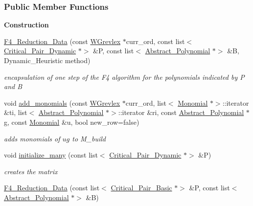 \subsubsection*{Public Member Functions}
\begin{Indent}\textbf{ Construction}\par
\begin{DoxyCompactItemize}
\item 
\hyperlink{group___g_b_computation_a41791d20f96fc7310a40a8e4c63aa4ef}{F4\+\_\+\+Reduction\+\_\+\+Data} (const \hyperlink{group__orderinggroup_class_w_grevlex}{W\+Grevlex} $\ast$curr\+\_\+ord, const list$<$ \hyperlink{group___g_b_computation_class_critical___pair___dynamic}{Critical\+\_\+\+Pair\+\_\+\+Dynamic} $\ast$$>$ \&P, const list$<$ \hyperlink{group__polygroup_class_abstract___polynomial}{Abstract\+\_\+\+Polynomial} $\ast$$>$ \&B, Dynamic\+\_\+\+Heuristic method)
\begin{DoxyCompactList}\small\item\em encapsulation of one step of the F4 algorithm for the polynomials indicated by {\ttfamily P} and {\ttfamily B} \end{DoxyCompactList}\item 
void \hyperlink{group___g_b_computation_a2096fe45e5eecc1c855acb82787f2719}{add\+\_\+monomials} (const \hyperlink{group__orderinggroup_class_w_grevlex}{W\+Grevlex} $\ast$curr\+\_\+ord, list$<$ \hyperlink{group__polygroup_class_monomial}{Monomial} $\ast$$>$\+::iterator \&ti, list$<$ \hyperlink{group__polygroup_class_abstract___polynomial}{Abstract\+\_\+\+Polynomial} $\ast$$>$\+::iterator \&ri, const \hyperlink{group__polygroup_class_abstract___polynomial}{Abstract\+\_\+\+Polynomial} $\ast$g, const \hyperlink{group__polygroup_class_monomial}{Monomial} \&u, bool new\+\_\+row=false)
\begin{DoxyCompactList}\small\item\em adds monomials of $ ug $ to {\ttfamily M\+\_\+build} \end{DoxyCompactList}\item 
void \hyperlink{group___g_b_computation_a9fa6a212375b9498ca86a2c18e94ca1e}{initialize\+\_\+many} (const list$<$ \hyperlink{group___g_b_computation_class_critical___pair___dynamic}{Critical\+\_\+\+Pair\+\_\+\+Dynamic} $\ast$$>$ \&P)
\begin{DoxyCompactList}\small\item\em creates the matrix \end{DoxyCompactList}\item 
\hyperlink{group___g_b_computation_ada9c61c0f75be4a2b3dd5c762c1c9a1b}{F4\+\_\+\+Reduction\+\_\+\+Data} (const list$<$ \hyperlink{group___g_b_computation_class_critical___pair___basic}{Critical\+\_\+\+Pair\+\_\+\+Basic} $\ast$$>$ \&P, const list$<$ \hyperlink{group__polygroup_class_abstract___polynomial}{Abstract\+\_\+\+Polynomial} $\ast$$>$ \&B)
$$
\end{DoxyCompactItemize}
\end{Indent}
